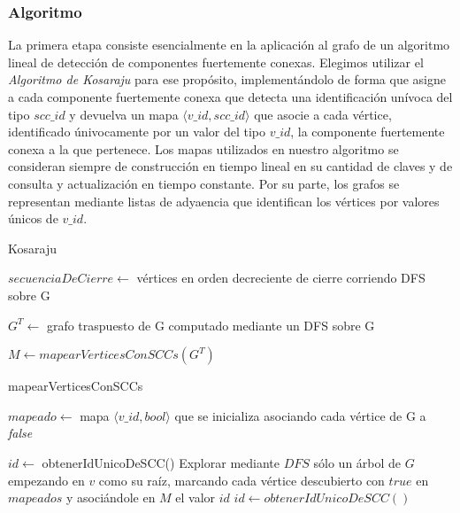 \subsubsection{Algoritmo}

La primera etapa consiste esencialmente en la aplicación al grafo de un algoritmo lineal de detección de componentes fuertemente conexas. Elegimos utilizar el \textit{Algoritmo de Kosaraju} para ese propósito, implementándolo de forma que asigne a cada componente fuertemente conexa que detecta una identificación unívoca del tipo $scc\_id$ y devuelva un mapa $\langle v\_id, scc\_id \rangle$ que asocie a cada vértice, identificado únivocamente por un valor del tipo $v\_id$, la componente fuertemente conexa a la que pertenece. Los mapas utilizados en nuestro algoritmo se consideran siempre de construcción en tiempo lineal en su cantidad de claves y de consulta y actualización en tiempo constante. Por su parte, los grafos se representan mediante listas de adyaencia que identifican los vértices por valores únicos de $v\_id$.

\bigskip

\begin{algorithm}[H]
	\caption{Kosaraju}

    $\mathit{secuenciaDeCierre} \gets$ vértices en orden decreciente de cierre corriendo DFS sobre G \;

    $\mathit{G^T} \gets$ grafo traspuesto de G computado mediante un DFS sobre G \;

    $\mathit{M} \gets \mathit{mapearVerticesConSCCs(G^T)}$

\end{algorithm}

\bigskip

\begin{algorithm}[H]
    \caption{mapearVerticesConSCCs}

    $\mathit{mapeado} \gets$ mapa $\langle v\_id, bool \rangle$ que se inicializa asociando cada vértice de G a \textit{false}\;

    $id \gets$ obtenerIdUnicoDeSCC() \;
     {
         {
            Explorar mediante $DFS$ sólo un árbol de $G$ empezando en $v$ como su raíz, marcando cada vértice descubierto con $true$ en $mapeados$ y asociándole en $M$ el valor $id$ \;
            $id \gets obtenerIdUnicoDeSCC()$ \;
        }
    }

\end{algorithm}

